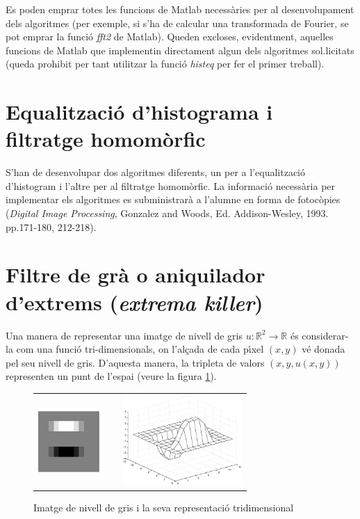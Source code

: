 \documentclass{article}
\def\R{\mathbb R}
\begin{document}
Es poden emprar totes les funcions de Matlab necess\`aries per al desenvolupament dels
algoritmes (per exemple, si s'ha de calcular una transformada de Fourier, se pot 
emprar la funci\'o {\it fft2} de Matlab). Queden excloses, evidentment, aquelles 
funcions de Matlab que implementin directament algun dels algoritmes sol.licitats
(queda prohibit per tant utilitzar la funci\'o {\it histeq} per fer el primer treball).

\section{Equalitzaci\'o d'histograma i filtratge homom\`orfic}
S'han de desenvolupar dos algoritmes diferents, un per a l'equalitzaci\'o d'histogram i 
l'altre per al filtratge homom\`orfic. La informaci\'o necess\`aria per implementar els algoritmes
es subministrar\`a a l'alumne en forma de fotoc\`opies 
({\it Digital Image Processing}, Gonzalez and Woods, Ed. Addison-Wesley, 1993. pp.171-180, 212-218).

\section{Filtre de gr\`a o aniquilador d'extrems ({\it extrema killer})}
Una manera de representar una imatge de nivell de gris $u:\R^2 \rightarrow \R$ 
\'es considerar-la com una funci\'o tri-dimensionals, on l'al\c{c}ada de cada 
p\'\i xel $(x,y)$ v\'e donada pel seu nivell de gris. D'aquesta manera, la tripleta 
de valors $(x,y,u(x,y))$ representen un punt de l'espai (veure la figura \ref{imtest}).  

\begin{figure}[htbp]
\begin{center}
\begin{tabular}{ccc}
\includegraphics[width=2.5cm]{imtest.eps} & & \includegraphics[width=4.5cm]{imtest3D.eps}
\end{tabular}
\caption{Imatge de nivell de gris i la seva representaci\'o tridimensional}
\label{imtest}
\end{center}
\end{figure}
\end{document}
